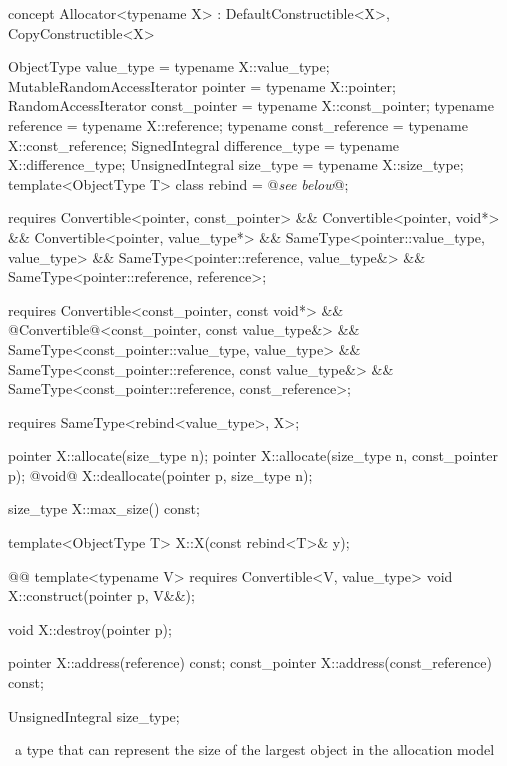 \documentclass[american,twoside]{book}
\begin{document}
\color{addclr}
\begin{itemdecl}
concept Allocator<typename X> : DefaultConstructible<X>, CopyConstructible<X> {
  ObjectType value_type               = typename X::value_type;
  MutableRandomAccessIterator pointer = typename X::pointer;
  RandomAccessIterator const_pointer  = typename X::const_pointer;
  typename reference                  = typename X::reference;
  typename const_reference            = typename X::const_reference;
  SignedIntegral difference_type      = typename X::difference_type;
  UnsignedIntegral size_type          = typename X::size_type; 
  template<ObjectType T> class rebind = @\textit{see below}@;

  requires Convertible<pointer, const_pointer> && 
           Convertible<pointer, void*> &&
           Convertible<pointer, value_type*> &&
           SameType<pointer::value_type, value_type> &&
           SameType<pointer::reference, value_type&> &&
           SameType<pointer::reference, reference>;

  requires Convertible<const_pointer, const void*> &&
           @\textcolor{addclr}{Convertible}@<const_pointer, const value_type&> && 
           SameType<const_pointer::value_type, value_type> &&
           SameType<const_pointer::reference, const value_type&> &&
           SameType<const_pointer::reference, const_reference>;
 
  requires SameType<rebind<value_type>, X>;

  pointer X::allocate(size_type n);
  pointer X::allocate(size_type n, const_pointer p);
  @\textcolor{addclr}{void}@ X::deallocate(pointer p, size_type n);

  size_type X::max_size() const;

  template<ObjectType T>
    X::X(const rebind<T>& y);

  @@
  template<typename V>
    requires Convertible<V, value_type>
    void X::construct(pointer p, V&&);

  void X::destroy(pointer p);

  pointer X::address(reference) const;
  const_pointer X::address(const_reference) const;
}
\end{itemdecl}
\color{black}

\color{addclr}
\begin{itemdecl}
UnsignedIntegral size_type;
\end{itemdecl}
\color{black}

\begin{itemdescr}
\pnum
\ctype\
a type that can represent the size of the largest object in the allocation model
\end{itemdescr}
\end{document}
